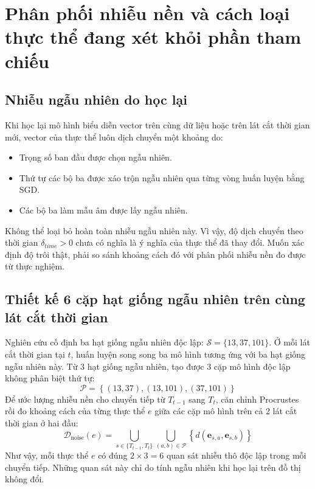 \section{Phân phối nhiễu nền và cách loại thực thể đang xét khỏi phần tham chiếu}
\label{sec:empirical_null_lto}

\subsection{Nhiễu ngẫu nhiên do học lại}
Khi học lại mô hình biểu diễn vector trên cùng dữ liệu hoặc trên lát cắt thời gian mới, vector của thực thể luôn dịch chuyển một khoảng do:
\begin{itemize}
    \item Trọng số ban đầu được chọn ngẫu nhiên.
    \item Thứ tự các bộ ba được xáo trộn ngẫu nhiên qua từng vòng huấn luyện bằng SGD.
    \item Các bộ ba làm mẫu âm được lấy ngẫu nhiên.
\end{itemize}
Không thể loại bỏ hoàn toàn nhiễu ngẫu nhiên này. Vì vậy, độ dịch chuyển theo thời gian $\delta_{time} > 0$ chưa có nghĩa là ý nghĩa của thực thể đã thay đổi. Muốn xác định độ trôi thật, phải so sánh khoảng cách đó với phân phối nhiễu nền đo được từ thực nghiệm.

\subsection{Thiết kế 6 cặp hạt giống ngẫu nhiên trên cùng lát cắt thời gian}
Nghiên cứu cố định ba hạt giống ngẫu nhiên độc lập: $\mathcal{S} = \{13, 37, 101\}$.
Ở mỗi lát cắt thời gian tại $t$, huấn luyện song song ba mô hình tương ứng với ba hạt giống ngẫu nhiên này.
Từ 3 hạt giống ngẫu nhiên, tạo được 3 cặp mô hình độc lập không phân biệt thứ tự:
\begin{equation}
\mathcal{P} = \left\{ (13, 37), (13, 101), (37, 101) \right\}
\end{equation}
Để ước lượng nhiễu nền cho chuyển tiếp từ $T_{t-1}$ sang $T_t$, căn chỉnh Procrustes rồi đo khoảng cách của từng thực thể $e$ giữa các cặp mô hình trên cả 2 lát cắt thời gian ở hai đầu:
\begin{equation}
\mathcal{D}_{\text{noise}}(e) = \bigcup_{s \in \{T_{t-1}, T_t\}} \bigcup_{(a, b) \in \mathcal{P}} \left\{ d\left(\mathbf{e}_{s, a}, \mathbf{e}_{s, b}\right) \right\}
\end{equation}
Như vậy, mỗi thực thể $e$ có đúng $2 \times 3 = 6$ quan sát nhiễu thô độc lập trong mỗi chuyển tiếp. Những quan sát này chỉ do tính ngẫu nhiên khi học lại trên đồ thị không đổi.

